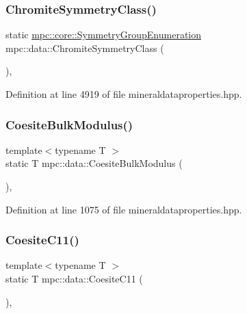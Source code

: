 \subsubsection{\texorpdfstring{Chromite\+Symmetry\+Class()}{ChromiteSymmetryClass()}}
{\footnotesize\ttfamily static \mbox{\hyperlink{namespacempc_1_1core_a9d979684062547055a0ef5c13077bad8}{mpc\+::core\+::\+Symmetry\+Group\+Enumeration}} mpc\+::data\+::\+Chromite\+Symmetry\+Class (\begin{DoxyParamCaption}{ }\end{DoxyParamCaption})\hspace{0.3cm}{\ttfamily [inline]}, {\ttfamily [static]}}



Definition at line 4919 of file mineraldataproperties.\+hpp.

\mbox{\label{namespacempc_1_1data_a550b6d1fd6757e162ee1039767d29e0f}} 
\subsubsection{\texorpdfstring{Coesite\+Bulk\+Modulus()}{CoesiteBulkModulus()}}
{\footnotesize\ttfamily template$<$typename T $>$ \\
static T mpc\+::data\+::\+Coesite\+Bulk\+Modulus (\begin{DoxyParamCaption}{ }\end{DoxyParamCaption})\hspace{0.3cm}{\ttfamily [inline]}, {\ttfamily [static]}}



Definition at line 1075 of file mineraldataproperties.\+hpp.

\mbox{\label{namespacempc_1_1data_a9a52412c9955c37082dfb735bce62578}} 
\subsubsection{\texorpdfstring{Coesite\+C11()}{CoesiteC11()}}
{\footnotesize\ttfamily template$<$typename T $>$ \\
static T mpc\+::data\+::\+Coesite\+C11 (\begin{DoxyParamCaption}{ }\end{DoxyParamCaption})\hspace{0.3cm}{\ttfamily [inline]}, {\ttfamily [static]}}



